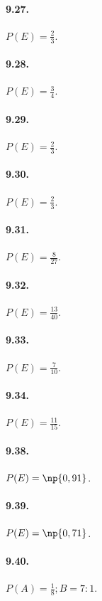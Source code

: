 \begin{multicols}{2}
\paragraph{9.27.} $P(E)=\frac 2 3$.

\paragraph{9.28.} $P(E)=\frac 3 4$.

\paragraph{9.29.} $P(E)=\frac 2 3$.

\paragraph{9.30.} $P(E)=\frac 2 3$.

\paragraph{9.31.} $P(E)=\frac 8{27}$.

\paragraph{9.32.} $P(E)=\frac{13}{40}$.

\paragraph{9.33.} $P(E)=\frac 7{10}$.

\paragraph{9.34.} $P(E)=\frac{11}{15}$.

\paragraph{9.38.} $P(E)=\np{0,91}$.

\paragraph{9.39.} $P(E)=\np{0,71}$.

\paragraph{9.40.} $P(A)=\frac 1 8;B=7:1$.


\end{multicols}
